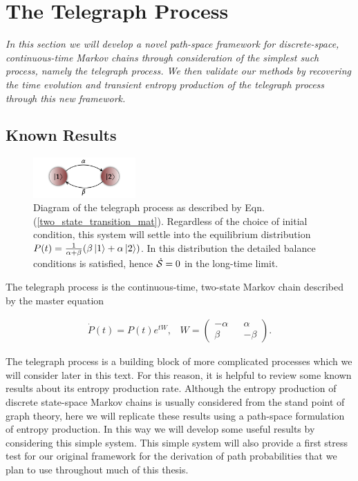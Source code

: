 

\section{The Telegraph Process}\label{chapter:telegraph}

\textit{In this section we will develop a novel path-space framework for discrete-space, continuous-time Markov chains through consideration of the simplest such process, namely the telegraph process. We then validate our methods by recovering the time evolution and transient entropy production of the telegraph process through this new framework.}

\subsection{Known Results}
\begin{figure}
\centering
\includegraphics[width = 0.35\textwidth]{figures/tele-diagram-3.png}
\caption{\footnotesize Diagram of the telegraph process as described by Eqn. (\ref{two_state_transition_mat}). Regardless of the choice of initial condition, this system will settle into the equilibrium distribution $P(t) = \frac{1}{\alpha +\beta}(\beta\ket{1} + \alpha \ket{2})$. In this distribution the detailed balance conditions is satisfied, hence $\dot{\mathcal{S}} = 0$ in the long-time limit.} 
\label{telegraph-diagram}
\end{figure}

The telegraph process is the continuous-time, two-state Markov chain described by the master equation

\begin{align}\label{two_state_transition_mat}
  \dot{P}(t) = P(t)e^{tW}, \; \; \; W = \begin{pmatrix}-\alpha && \alpha \\ \beta && -\beta \end{pmatrix}.
\end{align}


The telegraph process is a building block of more complicated processes which we will consider later in this text. For this reason, it is helpful to review some known results about its entropy production rate. Although the entropy production of discrete state-space Markov chains is usually considered from the stand point of graph theory, here we will replicate these results using a path-space formulation of entropy production. In this way we will develop some useful results by considering this simple system. This simple system will also provide a first stress test for our original framework for the derivation of path probabilities that we plan to use throughout much of this thesis. 

